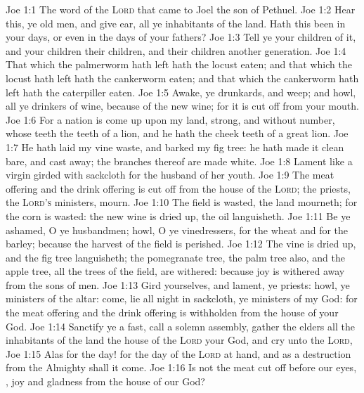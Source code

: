 \vs Joe 1:1 The word of the \textsc{Lord} that came to Joel the son of Pethuel.
\vs Joe 1:2 Hear this, ye old men, and give ear, all ye inhabitants of the land. Hath this been in your days, or even in the days of your fathers?
\vs Joe 1:3 Tell ye your children of it, and  your children  their children, and their children another generation.
\vs Joe 1:4 That which the palmerworm hath left hath the locust eaten; and that which the locust hath left hath the cankerworm eaten; and that which the cankerworm hath left hath the caterpiller eaten.
\vs Joe 1:5 Awake, ye drunkards, and weep; and howl, all ye drinkers of wine, because of the new wine; for it is cut off from your mouth.
\vs Joe 1:6 For a nation is come up upon my land, strong, and without number, whose teeth  the teeth of a lion, and he hath the cheek teeth of a great lion.
\vs Joe 1:7 He hath laid my vine waste, and barked my fig tree: he hath made it clean bare, and cast  away; the branches thereof are made white.
\vs Joe 1:8 Lament like a virgin girded with sackcloth for the husband of her youth.
\vs Joe 1:9 The meat offering and the drink offering is cut off from the house of the \textsc{Lord}; the priests, the \textsc{Lord's} ministers, mourn.
\vs Joe 1:10 The field is wasted, the land mourneth; for the corn is wasted: the new wine is dried up, the oil languisheth.
\vs Joe 1:11 Be ye ashamed, O ye husbandmen; howl, O ye vinedressers, for the wheat and for the barley; because the harvest of the field is perished.
\vs Joe 1:12 The vine is dried up, and the fig tree languisheth; the pomegranate tree, the palm tree also, and the apple tree,  all the trees of the field, are withered: because joy is withered away from the sons of men.
\vs Joe 1:13 Gird yourselves, and lament, ye priests: howl, ye ministers of the altar: come, lie all night in sackcloth, ye ministers of my God: for the meat offering and the drink offering is withholden from the house of your God.
\vs Joe 1:14 Sanctify ye a fast, call a solemn assembly, gather the elders  all the inhabitants of the land  the house of the \textsc{Lord} your God, and cry unto the \textsc{Lord},
\vs Joe 1:15 Alas for the day! for the day of the \textsc{Lord}  at hand, and as a destruction from the Almighty shall it come.
\vs Joe 1:16 Is not the meat cut off before our eyes, , joy and gladness from the house of our God?
